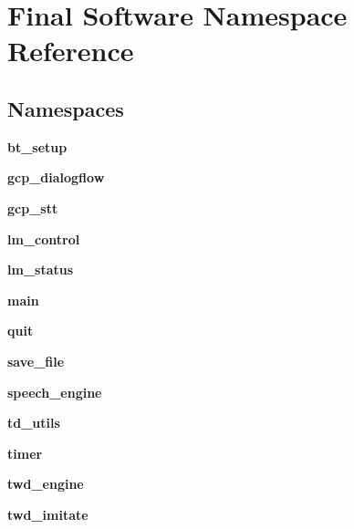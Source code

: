 \section{Final Software Namespace Reference}
\label{namespace_final_01_software}
\subsection*{Namespaces}
\begin{DoxyCompactItemize}
\item 
 \textbf{ bt\+\_\+setup}
\item 
 \textbf{ gcp\+\_\+dialogflow}
\item 
 \textbf{ gcp\+\_\+stt}
\item 
 \textbf{ lm\+\_\+control}
\item 
 \textbf{ lm\+\_\+status}
\item 
 \textbf{ main}
\item 
 \textbf{ quit}
\item 
 \textbf{ save\+\_\+file}
\item 
 \textbf{ speech\+\_\+engine}
\item 
 \textbf{ td\+\_\+utils}
\item 
 \textbf{ timer}
\item 
 \textbf{ twd\+\_\+engine}
\item 
 \textbf{ twd\+\_\+imitate}
\end{DoxyCompactItemize}
